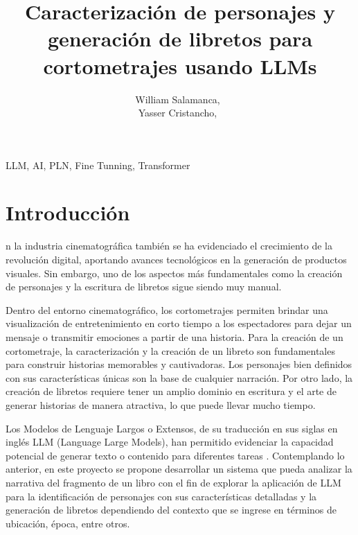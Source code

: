 \documentclass[journal,onecolumn]{IEEEtran}
\begin{document}
		
	
	
		\title{Caracterización de personajes y generación de libretos para cortometrajes usando LLMs}
	
		
		\author{William Salamanca,~\\
			Yasser Cristancho,~}%
		
	\maketitle
	
	
	
	
	
	\begin{IEEEkeywords}
		LLM, AI, PLN, Fine Tunning, Transformer
	\end{IEEEkeywords}
	
	\IEEEpeerreviewmaketitle
	
	
	
	\section{Introducción}

	n la industria cinematográfica también se ha evidenciado el crecimiento de la revolución digital, aportando avances tecnológicos en la generación de productos visuales. Sin embargo, uno de los aspectos más fundamentales como la creación de personajes y la escritura de libretos sigue siendo muy manual.
	
	Dentro del entorno cinematográfico, los cortometrajes permiten brindar una visualización de entretenimiento en corto tiempo a los espectadores para dejar un mensaje o transmitir emociones a partir de una historia. Para la creación de un cortometraje, la caracterización y la creación de un libreto son fundamentales para construir historias memorables y cautivadoras. Los personajes bien definidos con sus características únicas son la base de cualquier narración. Por otro lado, la creación de libretos requiere tener un amplio dominio en escritura y el arte de generar historias de manera atractiva, lo que puede llevar mucho tiempo.
	
	Los Modelos de Lenguaje Largos o Extensos, de su traducción en sus siglas en inglés LLM (Language Large Models), han permitido evidenciar la capacidad potencial de generar texto o contenido para diferentes tareas \cite{reference1}. Contemplando lo anterior, en este proyecto se propone desarrollar un sistema que pueda analizar la narrativa del fragmento de un libro con el fin de explorar la aplicación de LLM para la identificación de personajes con sus características detalladas y la generación de libretos dependiendo del contexto que se ingrese en términos de ubicación, época, entre otros.
\end{document}
